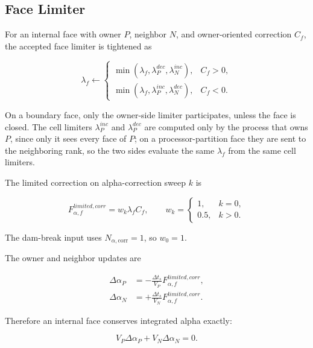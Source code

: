 \documentclass[11pt]{article}
\begin{document}
\subsection{Face Limiter}

For an internal face with owner \(P\), neighbor \(N\), and owner-oriented
correction \(C_f\), the accepted face limiter is tightened as

\begin{equation}
  \lambda_f
  \leftarrow
  \begin{cases}
    \min(\lambda_f,\lambda_P^{dec},\lambda_N^{inc}),
      & C_f>0,\\
    \min(\lambda_f,\lambda_P^{inc},\lambda_N^{dec}),
      & C_f<0.
  \end{cases}
  \label{eq:face-limiter}
\end{equation}

On a boundary face, only the owner-side limiter participates, unless the face is
closed.  The cell limiters \(\lambda_P^{inc}\) and \(\lambda_P^{dec}\) are
computed only by the process that owns \(P\), since only it sees every face of
\(P\); on a processor-partition face they are sent to the neighboring rank, so
the two sides evaluate the same \(\lambda_f\) from the same cell limiters.

The limited correction on alpha-correction sweep \(k\) is

\begin{equation}
  F_{\alpha,f}^{limited,corr}
  =
  w_k\lambda_f C_f,
  \qquad
  w_k=
  \begin{cases}
    1, & k=0,\\
    0.5, & k>0.
  \end{cases}
  \label{eq:limited-correction}
\end{equation}

The dam-break input uses \(N_{\alpha,\mathrm{corr}}=1\), so \(w_0=1\).

The owner and neighbor updates are

\begin{align}
  \Delta\alpha_P
  &=
  -\frac{\Delta t_s}{V_P}
  F_{\alpha,f}^{limited,corr},
  \\
  \Delta\alpha_N
  &=
  +\frac{\Delta t_s}{V_N}
  F_{\alpha,f}^{limited,corr}.
\end{align}

Therefore an internal face conserves integrated alpha exactly:

\begin{equation}
  V_P\Delta\alpha_P+V_N\Delta\alpha_N=0.
\end{equation}
\end{document}
